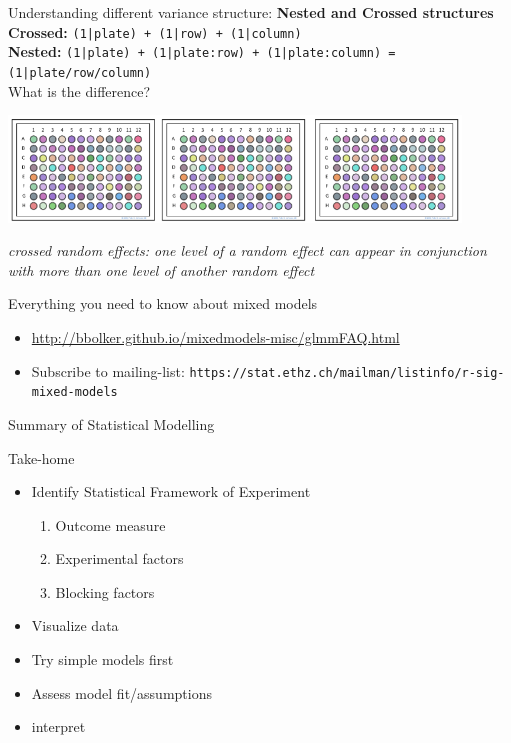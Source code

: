 \documentclass[10pt]{beamer}
\begin{document}
\begin{frame}{Understanding different variance structure: \textbf{Nested and Crossed structures}} 
\textbf{Crossed:} \texttt{(1|plate) + (1|row) + (1|column)}\\
\vspace{0.2cm}
\textbf{Nested:} \texttt{(1|plate) + (1|plate:row) + (1|plate:column) = (1|plate/row/column)}\\

What is the difference?

 \begin{center}
  \includegraphics[width=0.9\textwidth]{Figures/nestedplates}
 \end{center}

 \textit{crossed random effects: one level of a random effect can appear in conjunction with more than one level of another random effect}
\end{frame}



\begin{frame}{Everything you need to know about mixed models}

\begin{itemize}
 \item \url{http://bbolker.github.io/mixedmodels-misc/glmmFAQ.html}
 \item Subscribe to mailing-list: \texttt{https://stat.ethz.ch/mailman/listinfo/r-sig-mixed-models}
\end{itemize}

\end{frame}


\begin{frame}{Summary of Statistical Modelling}
 \begin{alertblock}{Take-home}
  \begin{itemize}[<+->]
   \item Identify Statistical Framework of Experiment
    \begin{enumerate}
     \item Outcome measure
     \item Experimental factors
     \item Blocking factors
    \end{enumerate}
  \item Visualize data
  \item Try simple models first
  \item Assess model fit/assumptions
  \item interpret
  \end{itemize}

 \end{alertblock}

 
\end{frame}
\end{document}
